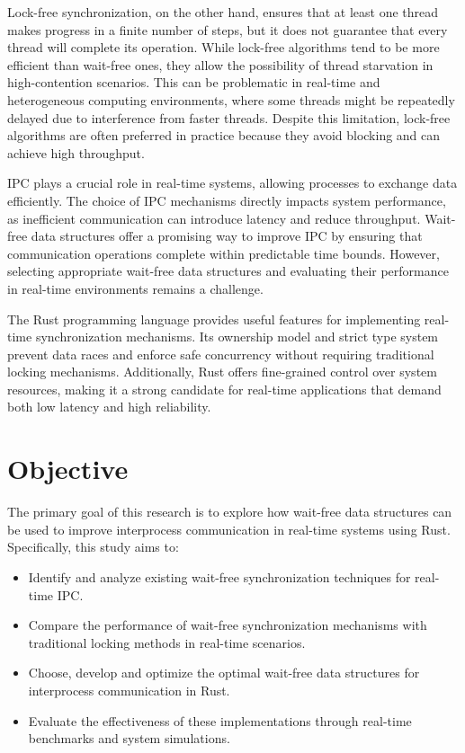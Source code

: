 Lock-free synchronization, on the other hand, ensures that at least one thread makes progress in a finite number of steps, but it does not guarantee that every thread will complete its operation. While lock-free algorithms tend to be more efficient than wait-free ones, they allow the possibility of thread starvation in high-contention scenarios. This can be problematic in real-time and heterogeneous computing environments, where some threads might be repeatedly delayed due to interference from faster threads. Despite this limitation, lock-free algorithms are often preferred in practice because they avoid blocking and can achieve high throughput. \cite{kogan2012methodology}

\ac{IPC} plays a crucial role in real-time systems, allowing processes to exchange data efficiently. The choice of \ac{IPC} mechanisms directly impacts system performance, as inefficient communication can introduce latency and reduce throughput. Wait-free data structures offer a promising way to improve \ac{IPC} by ensuring that communication operations complete within predictable time bounds. However, selecting appropriate wait-free data structures and evaluating their performance in real-time environments remains a challenge. \cite{timnat2014practical, michael1996simple, huang2002improvingWaitFree, pellegrini2020relevancewaitfreecoordinationalgorithms}

The Rust programming language provides useful features for implementing real-time synchronization mechanisms. Its ownership model and strict type system prevent data races and enforce safe concurrency without requiring traditional locking mechanisms. Additionally, Rust offers fine-grained control over system resources, making it a strong candidate for real-time applications that demand both low latency and high reliability. \cite{xu2023rust, sharma2024rustembeddedsystemscurrent}

\section{Objective}

The primary goal of this research is to explore how wait-free data structures can be used to improve interprocess communication in real-time systems using Rust. Specifically, this study aims to:

\begin{itemize}
\item Identify and analyze existing wait-free synchronization techniques for real-time \ac{IPC}.
\item Compare the performance of wait-free synchronization mechanisms with traditional locking methods in real-time scenarios.
\item Choose, develop and optimize the optimal wait-free data structures for interprocess communication in Rust.
\item Evaluate the effectiveness of these implementations through real-time benchmarks and system simulations.
\end{itemize}


